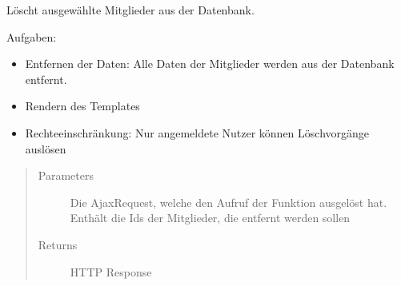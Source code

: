 \documentclass[letterpaper,10pt,english]{sphinxmanual}
\begin{document}
\begin{fulllineitems}
\label{\detokenize{masterCodeDoc:mitglieder.views.mitglieder_loeschen}}
Löscht ausgewählte Mitglieder aus der Datenbank.

Aufgaben:
\begin{itemize}
\item {} 
Entfernen der Daten: Alle Daten der Mitglieder werden aus der Datenbank entfernt.

\item {} 
Rendern des Templates

\item {} 
Rechteeinschränkung: Nur angemeldete Nutzer können Löschvorgänge auslösen

\end{itemize}
\begin{quote}\begin{description}
\item[{Parameters}] \leavevmode
{} \textendash{} Die Ajax\sphinxhyphen{}Request, welche den Aufruf der Funktion ausgelöst hat. Enthält die Ids der Mitglieder, die entfernt werden sollen

\item[{Returns}] \leavevmode
HTTP Response

\end{description}\end{quote}

\end{fulllineitems}

\end{document}
